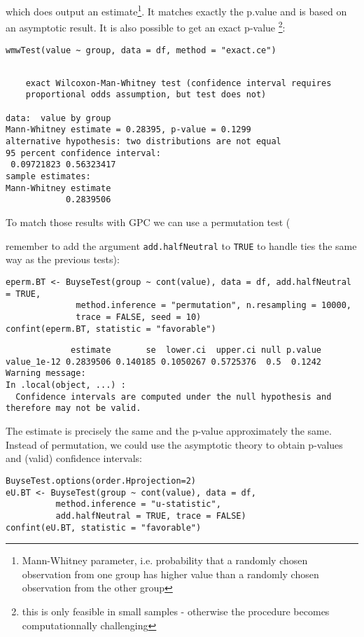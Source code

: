 \documentclass[12pt]{article}
\newcommand\Warning[1][3ex]{%
\renewcommand\stacktype{L}%
\scaleto{\stackon[1.3pt]{\color{red}$\triangle$}{\tiny\bfseries !}}{#1}%
\xspace
}
\begin{document}
which does output an estimate\footnote{Mann-Whitney parameter,
i.e. probability that a randomly chosen observation from one group has
higher value than a randomly chosen observation from the other
group}. It matches exactly the p.value and is based on an asymptotic
result. It is also possible to get an exact p-value \footnote{this is only
feasible in small samples - otherwise the procedure becomes
computationnally challenging}:
\lstset{language=r,label= ,caption= ,captionpos=b,numbers=none}
\begin{lstlisting}
wmwTest(value ~ group, data = df, method = "exact.ce")
\end{lstlisting}

\begin{verbatim}

	exact Wilcoxon-Man-Whitney test (confidence interval requires
	proportional odds assumption, but test does not)

data:  value by group
Mann-Whitney estimate = 0.28395, p-value = 0.1299
alternative hypothesis: two distributions are not equal
95 percent confidence interval:
 0.09721823 0.56323417
sample estimates:
Mann-Whitney estimate 
            0.2839506
\end{verbatim}

To match those results with GPC we can use a permutation test
(\Warning remember to add the argument \texttt{add.halfNeutral} to \texttt{TRUE} to
handle ties the same way as the previous tests):
\lstset{language=r,label= ,caption= ,captionpos=b,numbers=none}
\begin{lstlisting}
eperm.BT <- BuyseTest(group ~ cont(value), data = df, add.halfNeutral = TRUE,
		      method.inference = "permutation", n.resampling = 10000,
		      trace = FALSE, seed = 10)
confint(eperm.BT, statistic = "favorable")
\end{lstlisting}

\begin{verbatim}
             estimate       se  lower.ci  upper.ci null p.value
value_1e-12 0.2839506 0.140185 0.1050267 0.5725376  0.5  0.1242
Warning message:
In .local(object, ...) :
  Confidence intervals are computed under the null hypothesis and therefore may not be valid.
\end{verbatim}


The estimate is precisely the same and the p-value approximately the
same. Instead of permutation, we could use the asymptotic theory to
obtain p-values and (valid) confidence intervals:
\lstset{language=r,label= ,caption= ,captionpos=b,numbers=none}
\begin{lstlisting}
BuyseTest.options(order.Hprojection=2)
eU.BT <- BuyseTest(group ~ cont(value), data = df,
		  method.inference = "u-statistic",
		  add.halfNeutral = TRUE, trace = FALSE)
confint(eU.BT, statistic = "favorable")
\end{lstlisting}
\end{document}
